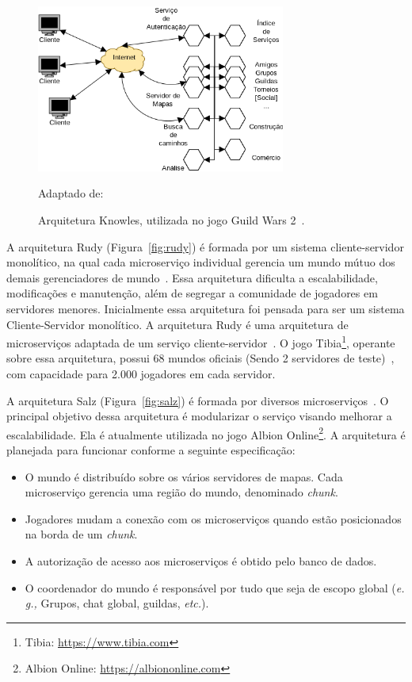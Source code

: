 \begin{figure}[htb!]
  \caption{Arquitetura Knowles, utilizada no jogo Guild Wars 2~\cite{stephenclarkewillson2017}.}
  \label{fig:knowles}
  \includegraphics[height=5.5cm]{arquiteturas/knowles.png}
  \centering

  Adaptado de:~\cite{stephenclarkewillson2017}
\end{figure}

A arquitetura Rudy (Figura~\ref{fig:rudy}) é formada por um sistema cliente-servidor monolítico, na qual cada microserviço individual gerencia um mundo mútuo dos demais gerenciadores de mundo~\cite{matthiasrudy2011}.
%
Essa arquitetura dificulta a escalabilidade, modificações e manutenção\cite{8169955}, além de segregar a comunidade de jogadores em servidores menores\cite{matthiasrudy2011}.
%
Inicialmente essa arquitetura foi pensada para ser um sistema Cliente-Servidor monolítico.
%
A arquitetura Rudy é uma arquitetura de microserviços adaptada de um serviço cliente-servidor~\cite{matthiasrudy2011}.
%
O jogo Tibia\footnote[1]{Tibia: \url{https://www.tibia.com}}, operante sobre essa arquitetura, possui 68 mundos oficiais (Sendo 2 servidores de teste)~\cite{matthiasrudy2011}, com capacidade para 2.000 jogadores em cada servidor.

A arquitetura Salz (Figura~\ref{fig:salz}) é formada por diversos microserviços~\cite{albion_online_unite}.
%
O principal objetivo dessa arquitetura é modularizar o serviço visando melhorar a escalabilidade.
%
Ela é atualmente utilizada no jogo Albion Online\footnote[2]{Albion Online: \url{https://albiononline.com}}.
%
A arquitetura é planejada para funcionar conforme a seguinte especificação\cite{albion_online_unite}:

\begin{itemize}
  \item O mundo é distribuído sobre os vários servidores de mapas. Cada microserviço gerencia uma região do mundo, denominado \textit{chunk}.
  \item Jogadores mudam a conexão com os microserviços quando estão posicionados na borda de um \textit{chunk}.
  \item A autorização de acesso aos microserviços é obtido pelo banco de dados.
  \item O coordenador do mundo é responsável por tudo que seja de escopo global (\textit{e. g.,} Grupos, chat global, guildas, \textit{etc.}).
\end{itemize}

